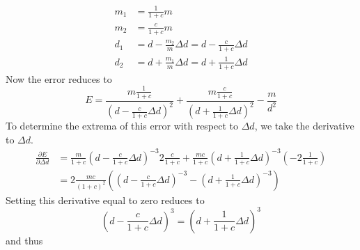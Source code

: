 \begin{enumerate}
\begin{align*}
m_1 &= \frac{1}{1+c}m\\
m_2 &= \frac{c}{1+c}m\\
d_1 &= d-\frac{m_2}{m}\Delta d = d-\frac{c}{1+c}\Delta d\\
d_2 &= d+\frac{m_1}{m}\Delta d = d+\frac{1}{1+c}\Delta d
\end{align*}
Now the error reduces to
\[
E = \frac{m\frac{1}{1+c}}{(d-\frac{c}{1+c}\Delta d)^2}+\frac{m\frac{c}{1+c}}{(d+\frac{1}{1+c}\Delta d)^2}-\frac{m}{d^2}
\]
To determine the extrema of this error with respect to $\Delta d$, we take the derivative to $\Delta d$.
\begin{align*}
\frac{\partial E}{\partial \Delta d} &= \frac{m}{1+c}\left(d-\frac{c}{1+c}\Delta d\right)^{-3}2\frac{c}{1+c}+\frac{mc}{1+c}\left(d+\frac{1}{1+c}\Delta d\right)^{-3}\left(-2\frac{1}{1+c}\right)\\
&= 2\frac{mc}{(1+c)^2}\left(\left(d-\frac{c}{1+c}\Delta d\right)^{-3}-\left(d+\frac{1}{1+c}\Delta d\right)^{-3}\right)
\end{align*}
Setting this derivative equal to zero reduces to
\[
\left(d-\frac{c}{1+c}\Delta d\right)^3 = \left(d+\frac{1}{1+c}\Delta d\right)^3
\]
and thus
\[

\]

\end{enumerate}